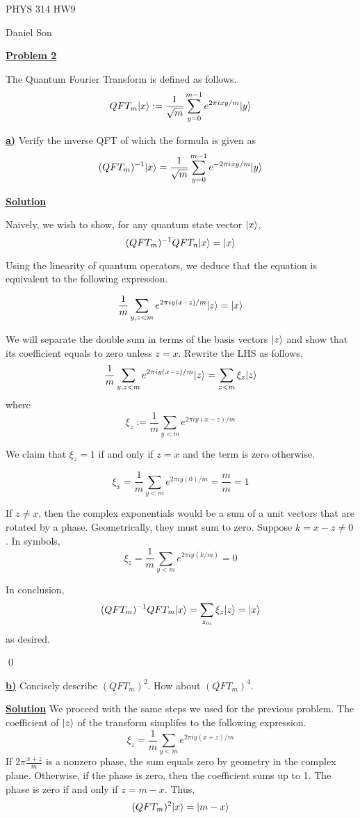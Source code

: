 \documentclass{article}
\newcommand{\new}[1]{
    \vspace{2mm}
    \noindent
    \textbf{
    \underline{#1}}
}
\DeclarePairedDelimiter\ket{\lvert}{\rangle}
\begin{document}
\begin{center}
\LARGE
PHYS 314 HW9

\Large
Daniel Son
\end{center}

\new{Problem 2}

The Quantum Fourier Transform is defined as follows. 
\[
    QFT_m\ket{x} := \frac 1 {\sqrt m} \sum _{y = 0}^{m - 1} e^{2\pi i xy / m} \ket {y}
\]

\new{a)} Verify the inverse QFT of which the formula is given as 
\[
    (QFT_m)^{-1} \ket{x} = \frac 1 {\sqrt m} 
    \sum_{y = 0}^{m - 1} e^{-2\pi i xy / m} \ket{y} 
\]

\new{Solution} 
Naively, we wish to show, for any quantum state vector $\ket{x}$, 
\[
    (QFT_m)^{-1} QFT_n \ket{x} = \ket {x}
\]

Using the linearity of quantum operators, we deduce 
that the equation is equivalent to the following expression. 

\[
    \frac 1 m \sum_{y, z < m} e^{2\pi i y (x-z)/m}\ket{z} = \ket {x}
\]

We will separate the double sum in terms of the basis vectors 
$\ket{z}$ and show that its coefficient equals to zero unless 
$z = x$. Rewrite the LHS as follows. 
\[
    \frac 1 m \sum_{y, z < m} e^{2\pi i y (x-z)/m}\ket{z} 
    = \sum_{z < m} \xi_z \ket{z}
\]
where 
\[
    \xi_z := \frac 1 m \sum_{y < m } e^{2\pi i y(x - z)/m}
\]

We claim that $\xi_z = 1$ if and only if $z = x$ and the 
term is zero otherwise. 

\[
    \xi_x = \frac 1 m \sum_{y < m } e^{2\pi i y(0)/m} 
    = \frac m m = 1
\]

If $z \neq x$, then the complex exponentials would be 
a sum of a unit vectors that are rotated by a phase. Geometrically, 
they must sum to zero. Suppose $k = x-z \neq 0$. In symbols, 
\[
    \xi_z = \frac 1 m \sum_{y < m} e^{2\pi i y (k/m)} = 0
\]

In conclusion, 
\[
    (QFT_m)^{-1}QFT_m \ket{x} = \sum_{z_m} \xi_z \ket{z} = \ket{x}
\]
as desired. 

\hfill \qed

\new{b)} Concisely describe $(QFT_m)^2$. How about 
$(QFT_m)^4$. 

\new{Solution} We proceed with the same steps we used for 
the previous problem. The coefficient of $\ket{z}$ of the 
transform simplifes to the following expression. 
\[
    \xi_z = \frac 1 m \sum_{y < m} e^{2\pi i y(x+z)/m} 
\]
If $2\pi \frac {x + z} m$ is a nonzero phase, the sum 
equals zero by geometry in the complex plane. Otherwise, 
if the phase is zero, then the coefficient sums up to 1. 
The phase is zero if and only if $z = m - x$. Thus, 
\[
    (QFT_m)^2 \ket{x} = \ket{m - x}
\]
\end{document}
